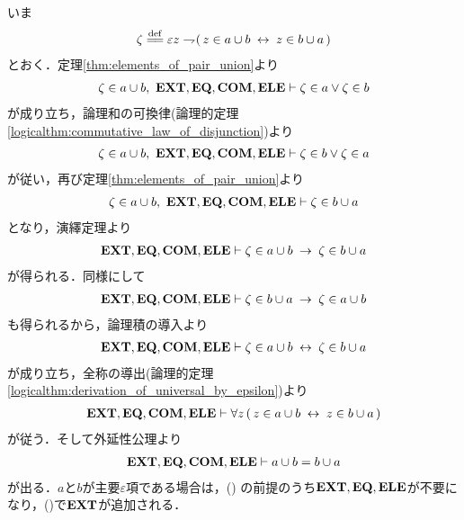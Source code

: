 	\begin{sketch}
		いま
		\begin{align}
			\zeta \defeq \varepsilon z \negation (\, z \in a \cup b \lrarrow z \in b \cup a\, )
		\end{align}
		とおく．定理\ref{thm:elements_of_pair_union}より
		\begin{align}
			\zeta \in a \cup b,\ \mbox{{\bf EXT}},\mbox{{\bf EQ}},\mbox{\bf COM},\mbox{{\bf ELE}} \vdash \zeta \in a \vee \zeta \in b
			\label{fom:symmetry_of_union_of_a_pair_1}
		\end{align}
		が成り立ち，論理和の可換律(論理的定理\ref{logicalthm:commutative_law_of_disjunction})より
		\begin{align}
			\zeta \in a \cup b,\ \mbox{{\bf EXT}},\mbox{{\bf EQ}},\mbox{\bf COM},\mbox{{\bf ELE}} \vdash \zeta \in b \vee \zeta \in a
		\end{align}
		が従い，再び定理\ref{thm:elements_of_pair_union}より
		\begin{align}
			\zeta \in a \cup b,\ \mbox{{\bf EXT}},\mbox{{\bf EQ}},\mbox{\bf COM},\mbox{{\bf ELE}} \vdash \zeta \in b \cup a
		\end{align}
		となり，演繹定理より
		\begin{align}
			\mbox{{\bf EXT}},\mbox{{\bf EQ}},\mbox{\bf COM},\mbox{{\bf ELE}} \vdash \zeta \in a \cup b \hspace{0.25em}\rightarrow\hspace{0.25em} \zeta \in b \cup a
		\end{align}
		が得られる．同様にして
		\begin{align}
			\mbox{{\bf EXT}},\mbox{{\bf EQ}},\mbox{\bf COM},\mbox{{\bf ELE}} \vdash \zeta \in b \cup a \hspace{0.25em}\rightarrow\hspace{0.25em} \zeta \in a \cup b
		\end{align}
		も得られるから，論理積の導入より
		\begin{align}
			\mbox{{\bf EXT}},\mbox{{\bf EQ}},\mbox{\bf COM},\mbox{{\bf ELE}} \vdash \zeta \in a \cup b \hspace{0.25em}\leftrightarrow\hspace{0.25em} \zeta \in b \cup a
		\end{align}
		が成り立ち，全称の導出(論理的定理\ref{logicalthm:derivation_of_universal_by_epsilon})より
		\begin{align}
			\mbox{{\bf EXT}},\mbox{{\bf EQ}},\mbox{\bf COM},\mbox{{\bf ELE}} \vdash \forall z\, (\, z \in a \cup b \hspace{0.25em}\leftrightarrow\hspace{0.25em} z \in b \cup a\, )
		\end{align}
		が従う．そして外延性公理より
		\begin{align}
			\mbox{{\bf EXT}},\mbox{{\bf EQ}},\mbox{\bf COM},\mbox{{\bf ELE}} \vdash a \cup b = b \cup a
			\label{fom:symmetry_of_union_of_a_pair_2}
		\end{align}
		が出る．$a$と$b$が主要$\varepsilon$項である場合は，()
		の前提のうち$\mbox{{\bf EXT}},\mbox{{\bf EQ}},\mbox{{\bf ELE}}$が不要になり，()で$\mbox{{\bf EXT}}$が追加される．
		\QED
	\end{sketch}
	
